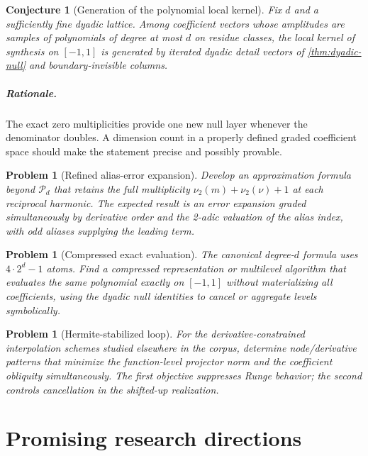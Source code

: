 \documentclass[11pt,oneside]{book}
\newtheorem{conjecture}[theorem]{Conjecture}
\newtheorem{problem}[theorem]{Problem}
\theoremstyle{definition}
\theoremstyle{remark}
\newcommand{\Pp}{\mathcal P}
\newcommand{\vtwo}{\nu_2}
\begin{document}
\begin{conjecture}[Generation of the polynomial local kernel]
\label{conj:null-generation}
Fix \(d\) and a sufficiently fine dyadic lattice.  Among coefficient vectors whose amplitudes are samples of polynomials of degree at most \(d\) on residue classes, the local kernel of synthesis on \([-1,1]\) is generated by iterated dyadic detail vectors of \cref{thm:dyadic-null} and boundary-invisible columns.
\end{conjecture}

\paragraph{Rationale.}
The exact zero multiplicities provide one new null layer whenever the denominator doubles.  A dimension count in a properly defined graded coefficient space should make the statement precise and possibly provable.

\begin{problem}[Refined alias-error expansion]
\label{prob:alias-expansion}
Develop an approximation formula beyond \(\Pp_d\) that retains the full multiplicity
\(\vtwo(m)+\vtwo(\nu)+1\) at each reciprocal harmonic.  The expected result is an error expansion graded simultaneously by derivative order and the 2-adic valuation of the alias index, with odd aliases supplying the leading term.
\end{problem}

\begin{problem}[Compressed exact evaluation]
\label{prob:compressed-evaluation}
The canonical degree-\(d\) formula uses \(4\cdot2^d-1\) atoms.  Find a compressed representation or multilevel algorithm that evaluates the same polynomial exactly on \([-1,1]\) without materializing all coefficients, using the dyadic null identities to cancel or aggregate levels symbolically.
\end{problem}

\begin{problem}[Hermite-stabilized loop]
\label{prob:hermite-loop}
For the derivative-constrained interpolation schemes studied elsewhere in the corpus, determine node/derivative patterns that minimize the function-level projector norm and the coefficient obliquity simultaneously.  The first objective suppresses Runge behavior; the second controls cancellation in the shifted-up realization.
\end{problem}

\chapter{Promising research directions}
\label{ch:future}
\end{document}
